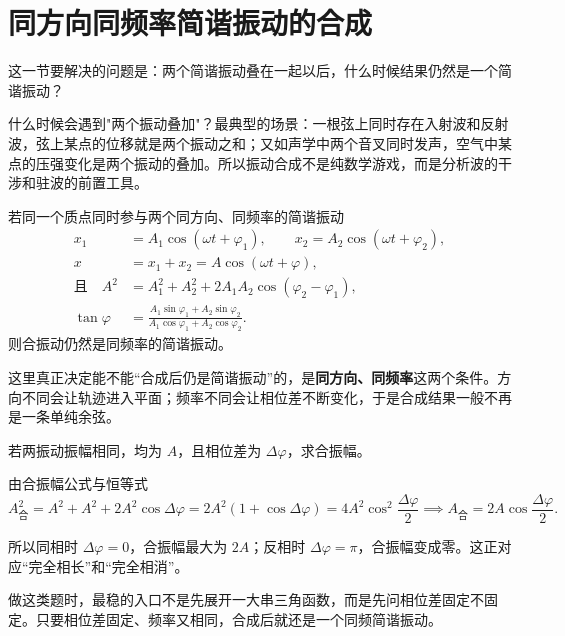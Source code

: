 \documentclass[lang=cn,11pt]{elegantbook}
\newcommand{\bridge}[1]{\begin{note}#1\end{note}}
\begin{document}
\section{同方向同频率简谐振动的合成}

这一节要解决的问题是：两个简谐振动叠在一起以后，什么时候结果仍然是一个简谐振动？

\bridge{什么时候会遇到"两个振动叠加"？最典型的场景：一根弦上同时存在入射波和反射波，弦上某点的位移就是两个振动之和；又如声学中两个音叉同时发声，空气中某点的压强变化是两个振动的叠加。所以振动合成不是纯数学游戏，而是分析波的干涉和驻波的前置工具。}

若同一个质点同时参与两个同方向、同频率的简谐振动
\[
\begin{aligned}
x_1&=A_1\cos(\omega t+\varphi_1),\qquad
x_2=A_2\cos(\omega t+\varphi_2),\\
x&=x_1+x_2=A\cos(\omega t+\varphi),\\
\text{且}\quad
A^2&=A_1^2+A_2^2+2A_1A_2\cos(\varphi_2-\varphi_1),\\
\tan\varphi&=\frac{A_1\sin\varphi_1+A_2\sin\varphi_2}{A_1\cos\varphi_1+A_2\cos\varphi_2}.
\end{aligned}
\]
则合振动仍然是同频率的简谐振动。

\begin{note}
这里真正决定能不能“合成后仍是简谐振动”的，是\textbf{同方向、同频率}这两个条件。方向不同会让轨迹进入平面；频率不同会让相位差不断变化，于是合成结果一般不再是一条单纯余弦。
\end{note}

\begin{example}[如何快速判断合振幅]
若两振动振幅相同，均为 \(A\)，且相位差为 \(\Delta\varphi\)，求合振幅。
\end{example}

\begin{solution}
由合振幅公式与恒等式
\[
A_{\text{合}}^2=A^2+A^2+2A^2\cos\Delta\varphi
=2A^2(1+\cos\Delta\varphi)
=4A^2\cos^2\frac{\Delta\varphi}{2}
\implies
A_{\text{合}}=2A\cos\frac{\Delta\varphi}{2}.
\]

所以同相时 \(\Delta\varphi=0\)，合振幅最大为 \(2A\)；反相时 \(\Delta\varphi=\pi\)，合振幅变成零。这正对应“完全相长”和“完全相消”。
\end{solution}

\begin{remark}
做这类题时，最稳的入口不是先展开一大串三角函数，而是先问相位差固定不固定。只要相位差固定、频率又相同，合成后就还是一个同频简谐振动。
\end{remark}
\end{document}
